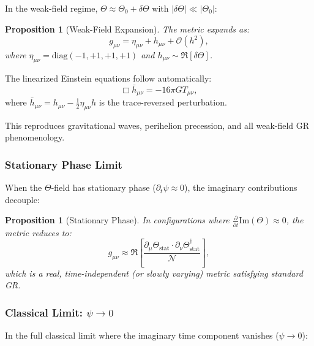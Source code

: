 \documentclass[12pt]{article}
\newtheorem{proposition}[theorem]{Proposition}
\theoremstyle{definition}
\theoremstyle{remark}
\begin{document}
In the weak-field regime, $\Theta \approx \Theta_0 + \delta\Theta$ with $|\delta\Theta| \ll |\Theta_0|$:

\begin{proposition}[Weak-Field Expansion]
The metric expands as:
\begin{equation}
g_{\mu\nu} = \eta_{\mu\nu} + h_{\mu\nu} + \mathcal{O}(h^2),
\end{equation}
where $\eta_{\mu\nu} = \text{diag}(-1,+1,+1,+1)$ and $h_{\mu\nu} \sim \Re[\delta\Theta]$.
\end{proposition}

The linearized Einstein equations follow automatically:
\begin{equation}
\Box \bar{h}_{\mu\nu} = -16\pi G T_{\mu\nu},
\end{equation}
where $\bar{h}_{\mu\nu} = h_{\mu\nu} - \frac{1}{2}\eta_{\mu\nu}h$ is the trace-reversed perturbation.

This reproduces gravitational waves, perihelion precession, and all weak-field GR phenomenology.

\subsubsection{Stationary Phase Limit}

When the $\Theta$-field has stationary phase ($\partial_t \psi \approx 0$), the imaginary contributions decouple:

\begin{proposition}[Stationary Phase]
In configurations where $\frac{\partial}{\partial t}\text{Im}(\Theta) \approx 0$, the metric reduces to:
\begin{equation}
g_{\mu\nu} \approx \Re\left[\frac{\partial_\mu \Theta_{\text{stat}} \cdot \partial_\nu \Theta_{\text{stat}}^\dagger}{\mathcal{N}}\right],
\end{equation}
which is a real, time-independent (or slowly varying) metric satisfying standard GR.
\end{proposition}

\subsubsection{Classical Limit: $\psi \to 0$}

In the full classical limit where the imaginary time component vanishes ($\psi \to 0$):
\end{document}
